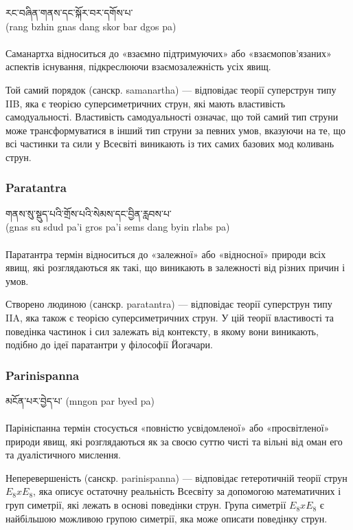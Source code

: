 \ti རང་བཞིན་གནས་དང་སྐོར་བར་དགོས་པ་ 
\\
\ua (rang bzhin gnas dang skor bar dgos pa)\\
\\
Саманартха відноситься до «взаємно підтримуючих» або «взаємопов'язаних»
аспектів існування, підкреслюючи взаємозалежність усіх явищ.

Той самий порядок (санскр. samanartha) --- відповідає теорії суперструн типу IIB,
яка є теорією суперсиметричних струн, які мають властивість самодуальності.
Властивість самодуальності означає, що той самий тип струни може трансформуватися
в інший тип струни за певних умов, вказуючи на те, що всі частинки та сили у
Всесвіті виникають із тих самих базових мод коливань струн.

\subsubsection*{Paratantra}

\ti གནས་སུ་སྡུད་པའི་གྲོས་པའི་སེམས་དང་བྱིན་རླབས་པ་  
\\
\ua (gnas su sdud pa'i gros pa'i sems dang byin rlabs pa)\\
\\
Паратантра термін відноситься до «залежної» або «відносної» природи всіх явищ,
які розглядаються як такі, що виникають в залежності від різних причин і умов.

Створено людиною (санскр. paratantra) --- відповідає теорії суперструн типу IIA,
яка також є теорією суперсиметричних струн. У цій теорії властивості та поведінка
частинок і сил залежать від контексту, в якому вони виникають, подібно до ідеї
паратантри у філософії Йогачари.

\newpage
\subsubsection*{Parinispanna}

\ti མངོན་པར་བྱེད་པ་  \ua (mngon par byed pa)\\
\\
Парініспанна термін стосується «повністю усвідомленої» або «просвітленої» природи
явищ, які розглядаються як за своєю суттю чисті та вільні від оман его та
дуалістичного мислення.

Неперевершеність (санскр. parinispanna) --- відповідає гетеротичній теорії струн $E_8 x E_8$,
яка описує остаточну реальність Всесвіту за допомогою математичних і груп симетрії, які
лежать в основі поведінки струн. Група симетрії $E_8 x E_8$ є найбільшою можливою групою симетрії,
яка може описати поведінку струн.

